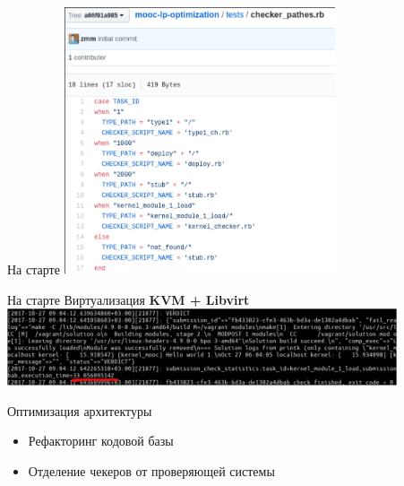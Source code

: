 \documentclass{beamer}
\begin{document}
\begin{frame}{На старте}
	\includegraphics[width=80mm]{./patchesrb.pdf}
\end{frame}

\begin{frame}{На старте}
	Виртуализация \textbf{KVM + Libvirt}
	\includegraphics[width=115mm]{./length_start.pdf}
\end{frame}

\begin{frame}{Оптимизация архитектуры}
	\begin{itemize}
		\item Рефакторинг кодовой базы
		\item Отделение чекеров от проверяющей системы
	\end{itemize}
\end{frame}
\end{document}
